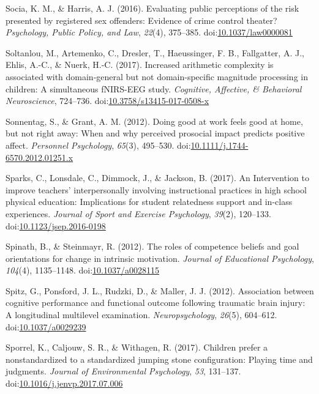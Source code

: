 \documentclass[english,man]{apa6}
\theoremstyle{definition}
\theoremstyle{definition}
\theoremstyle{definition}
\theoremstyle{remark}
\begin{document}
\hypertarget{ref-Socia2016}{}
Socia, K. M., \& Harris, A. J. (2016). Evaluating public perceptions of
the risk presented by registered sex offenders: Evidence of crime
control theater? \emph{Psychology, Public Policy, and Law},
\emph{22}(4), 375--385.
doi:\href{https://doi.org/10.1037/law0000081}{10.1037/law0000081}

\hypertarget{ref-Soltanlou2017}{}
Soltanlou, M., Artemenko, C., Dresler, T., Haeussinger, F. B.,
Fallgatter, A. J., Ehlis, A.-C., \& Nuerk, H.-C. (2017). Increased
arithmetic complexity is associated with domain-general but not
domain-specific magnitude processing in children: A simultaneous
fNIRS-EEG study. \emph{Cognitive, Affective, \& Behavioral
Neuroscience}, 724--736.
doi:\href{https://doi.org/10.3758/s13415-017-0508-x}{10.3758/s13415-017-0508-x}

\hypertarget{ref-Sonnentag2012}{}
Sonnentag, S., \& Grant, A. M. (2012). Doing good at work feels good at
home, but not right away: When and why perceived prosocial impact
predicts positive affect. \emph{Personnel Psychology}, \emph{65}(3),
495--530.
doi:\href{https://doi.org/10.1111/j.1744-6570.2012.01251.x}{10.1111/j.1744-6570.2012.01251.x}

\hypertarget{ref-Sparks2017}{}
Sparks, C., Lonsdale, C., Dimmock, J., \& Jackson, B. (2017). An
Intervention to improve teachers' interpersonally involving
instructional practices in high school physical education: Implications
for student relatedness support and in-class experiences. \emph{Journal
of Sport and Exercise Psychology}, \emph{39}(2), 120--133.
doi:\href{https://doi.org/10.1123/jsep.2016-0198}{10.1123/jsep.2016-0198}

\hypertarget{ref-Spinath2012}{}
Spinath, B., \& Steinmayr, R. (2012). The roles of competence beliefs
and goal orientations for change in intrinsic motivation. \emph{Journal
of Educational Psychology}, \emph{104}(4), 1135--1148.
doi:\href{https://doi.org/10.1037/a0028115}{10.1037/a0028115}

\hypertarget{ref-Spitz2012}{}
Spitz, G., Ponsford, J. L., Rudzki, D., \& Maller, J. J. (2012).
Association between cognitive performance and functional outcome
following traumatic brain injury: A longitudinal multilevel examination.
\emph{Neuropsychology}, \emph{26}(5), 604--612.
doi:\href{https://doi.org/10.1037/a0029239}{10.1037/a0029239}

\hypertarget{ref-Sporrel2017}{}
Sporrel, K., Caljouw, S. R., \& Withagen, R. (2017). Children prefer a
nonstandardized to a standardized jumping stone configuration: Playing
time and judgments. \emph{Journal of Environmental Psychology},
\emph{53}, 131--137.
doi:\href{https://doi.org/10.1016/j.jenvp.2017.07.006}{10.1016/j.jenvp.2017.07.006}
\end{document}

